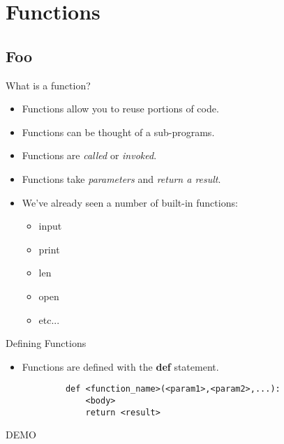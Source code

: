 \documentclass[serif,xcolor=pdftex,dvipsnames,table,hyperref={bookmarks=false,breaklinks}]{beamer}
\begin{document}
\section{Functions}
\subsection{Foo}

\begin{frame}[t]{What is a function?}
	\begin{itemize}[<+->]
		\item Functions allow you to reuse portions of code.
		\item Functions can be thought of a sub-programs.
		\item Functions are \textit{called} or \textit{invoked}.
		\item Functions take \textit{parameters} and \textit{return a result}.
		\item We've already seen a number of built-in functions:
		\begin{itemize}[<+->]
			\item input
			\item print
			\item len
			\item open
			\item etc...
		\end{itemize}
	\end{itemize}
\end{frame}

\begin{frame}[t,fragile]{Defining Functions}
	\begin{itemize}[<+->]
		\item Functions are defined with the \textbf{def} statement.
	\end{itemize}
	\pause
	\begin{tcolorbox}
		\begin{verbatim}
			def <function_name>(<param1>,<param2>,...):
			    <body>
			    return <result>
		\end{verbatim}
	\end{tcolorbox}
	\pause
	\centering
	\Huge{DEMO}
\end{frame}

\end{document}
